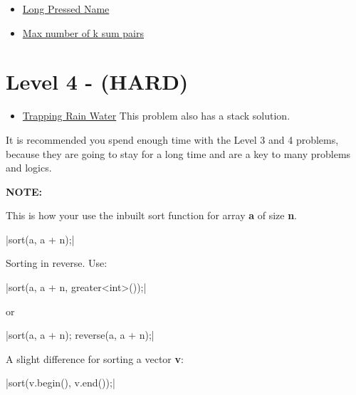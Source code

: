 \documentclass[13pt,oneside,a4paper]{book}
\begin{document}
\begin{itemize}
        \item \href{https://leetcode.com/problems/long-pressed-name/}{Long Pressed Name}
        \item \href{https://leetcode.com/problems/max-number-of-k-sum-pairs/}{Max number of k sum pairs}
\end{itemize}

\section{Level 4 - (HARD)}

\begin{itemize}
        \item \href{https://leetcode.com/problems/trapping-rain-water/}{Trapping Rain Water} This problem also has a stack solution.
\end{itemize}

It is recommended you spend enough time with the Level 3 and 4 problems, because they are going to stay for a long time
and are a key to many problems and logics.

\bigskip

\textbf{NOTE: }\\ 
\smallskip

This is how your use the inbuilt sort function for array \textbf{a} of size \textbf{n}.

|sort(a, a + n);|

\bigskip

Sorting in reverse.
\smallskip
Use:

|sort(a, a + n, greater<int>());|

or

|sort(a, a + n); reverse(a, a + n);|

A slight difference for sorting a vector \textbf{v}:

|sort(v.begin(), v.end());|
\end{document}
